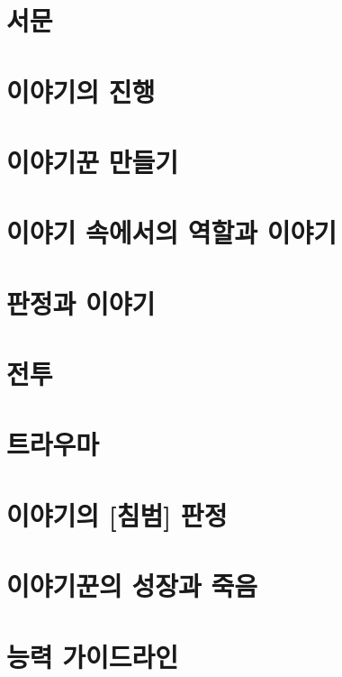 \documentclass{report}
\begin{document}
	\parttoc
	
	\chapter{서문}
		
	
	\chapter{이야기의 진행}
		
	
	\chapter{이야기꾼 만들기}
		
	
	\chapter{이야기 속에서의 역할과 이야기}
		
	
	\chapter{판정과 이야기}
		
	
	\chapter{전투}
		
	
	\chapter{트라우마}\label{트라우마}
		
	
	\chapter{이야기의 [침범] 판정}\label{침범_판정}
		
	
	\chapter{이야기꾼의 성장과 죽음}\label{성장}
		
	
	\chapter{능력 가이드라인}\label{능력_가이드라인}
		
	
\end{document}
